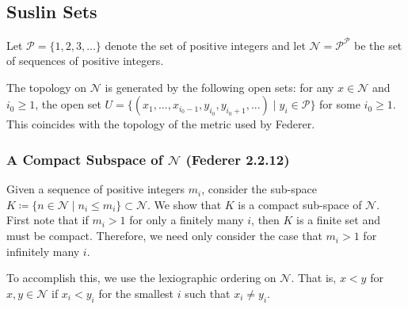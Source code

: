 \subsection{Suslin Sets}

Let \(\mathcal P = \{1, 2, 3, ...\}\) denote the set of positive integers and let
\(\mathcal N = {\mathcal P}^{\mathcal P}\) be the set of sequences of positive integers.

The topology on \(\mathcal N\) is generated by the following open sets: for any \(x \in \mathcal N\) and
\(i_0 \geq 1\), the open set
\(U = \{(x_1, ..., x_{i_0 - 1}, y_{i_0}, y_{i_0 + 1}, ...) \mid y_i \in \mathcal P\}\) for some \(i_0 \geq 1\).
This coincides with the topology of the metric used by Federer.

\subsubsection{A Compact Subspace of \(\mathcal N\) (Federer 2.2.12)}

Given a sequence of positive integers \(m_i\), consider the sub-space
\(K \coloneqq \{n \in \mathcal N \mid n_i \leq m_i\} \subset \mathcal N\). We show that \(K\) is a compact
sub-space of \(\mathcal N\). First note that if \(m_i > 1\) for only a finitely many \(i\), then \(K\) is a finite
set and must be compact. Therefore, we need only consider the case that \(m_i > 1\) for infinitely many  \(i\).

To accomplish this, we use the lexiographic ordering on \(\mathcal N\). That is, \(x < y\) for
\(x, y \in \mathcal N\) if \(x_i < y_i\) for the smallest \(i\) such that \(x_i \neq y_i\).

